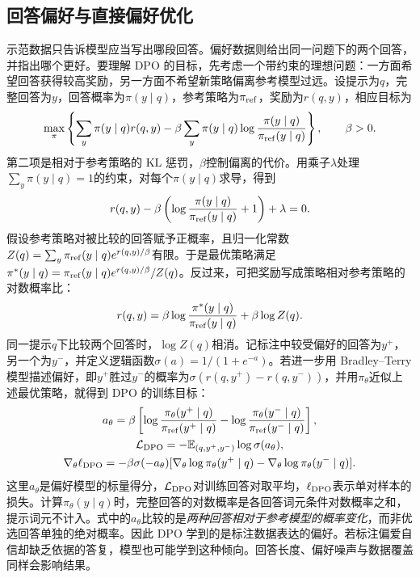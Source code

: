 \subsection{回答偏好与直接偏好优化}
示范数据只告诉模型应当写出哪段回答。偏好数据则给出同一问题下的两个回答，并指出哪个更好。要理解 DPO 的目标，先考虑一个带约束的理想问题：一方面希望回答获得较高奖励，另一方面不希望新策略偏离参考模型过远。设提示为$q$，完整回答为$y$，回答概率为$\pi(y\mid q)$，参考策略为$\pi_{\rm ref}$，奖励为$r(q,y)$，相应目标为
\begin{equation}
 \max_\pi\left\{\sum_y\pi(y\mid q)r(q,y)
 -\beta\sum_y\pi(y\mid q)\log\frac{\pi(y\mid q)}{\pi_{\rm ref}(y\mid q)}\right\},\qquad\beta>0.
\end{equation}
第二项是相对于参考策略的 KL 惩罚，$\beta$控制偏离的代价。用乘子$\lambda$处理$\sum_y\pi(y\mid q)=1$的约束，对每个$\pi(y\mid q)$求导，得到
\begin{equation}
 r(q,y)-\beta\left(\log\frac{\pi(y\mid q)}{\pi_{\rm ref}(y\mid q)}+1\right)+\lambda=0.
\end{equation}
假设参考策略对被比较的回答赋予正概率，且归一化常数$Z(q)=\sum_y\pi_{\rm ref}(y\mid q)e^{r(q,y)/\beta}$有限。于是最优策略满足$\pi^*(y\mid q)=\pi_{\rm ref}(y\mid q)e^{r(q,y)/\beta}/Z(q)$。反过来，可把奖励写成策略相对参考策略的对数概率比：
\begin{equation}
 r(q,y)=\beta\log\frac{\pi^*(y\mid q)}{\pi_{\rm ref}(y\mid q)}+\beta\log Z(q).
\end{equation}
同一提示$q$下比较两个回答时，$\log Z(q)$相消。记标注中较受偏好的回答为$y^+$，另一个为$y^-$，并定义逻辑函数$\sigma(a)=1/(1+e^{-a})$。若进一步用 Bradley--Terry 模型描述偏好，即$y^+$胜过$y^-$的概率为$\sigma(r(q,y^+)-r(q,y^-))$，并用$\pi_\theta$近似上述最优策略，就得到 DPO 的训练目标：
\begin{gather}
 a_\theta=\beta\left[\log\frac{\pi_\theta(y^+\mid q)}{\pi_{\rm ref}(y^+\mid q)}-
 \log\frac{\pi_\theta(y^-\mid q)}{\pi_{\rm ref}(y^-\mid q)}\right],\\
 \mathcal L_{\rm DPO}=-\mathbb{E}_{(q,y^+,y^-)}\log\sigma(a_\theta),\\
 \nabla_\theta\ell_{\rm DPO}=-\beta\sigma(-a_\theta)
 [\nabla_\theta\log\pi_\theta(y^+\mid q)-\nabla_\theta\log\pi_\theta(y^-\mid q)].
\end{gather}
这里$a_\theta$是偏好模型的标量得分，$\mathcal L_{\rm DPO}$对训练回答对取平均，$\ell_{\rm DPO}$表示单对样本的损失。计算$\pi_\theta(y\mid q)$时，完整回答的对数概率是各回答词元条件对数概率之和，提示词元不计入。式中的$a_\theta$比较的是\emph{两种回答相对于参考模型的概率变化}，而非优选回答单独的绝对概率。因此 DPO 学到的是标注数据表达的偏好。若标注偏爱自信却缺乏依据的答复，模型也可能学到这种倾向。回答长度、偏好噪声与数据覆盖同样会影响结果。

